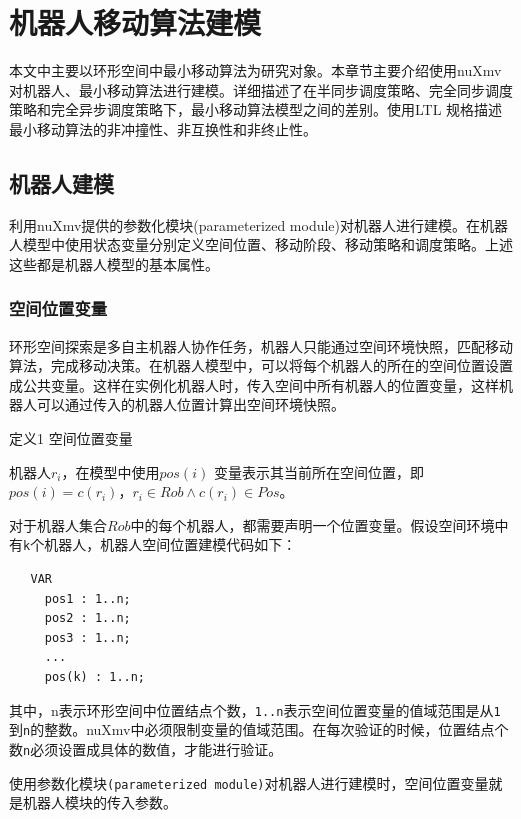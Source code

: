 ﻿\chapter{机器人移动算法建模}
本文中主要以环形空间中最小移动算法为研究对象。本章节主要介绍使用nuXmv对机器人、最小移动算法进行建模。详细描述了在半同步调度策略、完全同步调度策略和完全异步调度策略下，最小移动算法模型之间的差别。使用LTL 规格描述最小移动算法的非冲撞性、非互换性和非终止性。

\section{机器人建模}
利用nuXmv提供的参数化模块(parameterized module)对机器人进行建模。在机器人模型中使用状态变量分别定义空间位置、移动阶段、移动策略和调度策略。上述这些都是机器人模型的基本属性。

\subsection{空间位置变量}
环形空间探索是多自主机器人协作任务，机器人只能通过空间环境快照，匹配移动算法，完成移动决策。在机器人模型中，可以将每个机器人的所在的空间位置设置成公共变量。这样在实例化机器人时，传入空间中所有机器人的位置变量，这样机器人可以通过传入的机器人位置计算出空间环境快照。

\vspace{0.5cm}

\begin{bfseries} 定义1 \quad 空间位置变量 \quad \end{bfseries} 机器人$r_i$，在模型中使用$pos\left(i\right)$ 变量表示其当前所在空间位置，即$pos\left(i\right) = c\left(r_i\right)$，$r_i \in Rob \land c\left(r_i\right) \in Pos $。

\vspace{0.5cm}

对于机器人集合$Rob$中的每个机器人，都需要声明一个位置变量。假设空间环境中有\verb|k|个机器人，机器人空间位置建模代码如下：

\begin{lstlisting}
   VAR
     pos1 : 1..n;
     pos2 : 1..n;
     pos3 : 1..n;
     ...
     pos(k) : 1..n;
\end{lstlisting}

其中，n表示环形空间中位置结点个数，\verb|1..n|表示空间位置变量的值域范围是从\verb|1|到\verb|n|的整数。nuXmv中必须限制变量的值域范围。在每次验证的时候，位置结点个数\verb|n|必须设置成具体的数值，才能进行验证。

使用参数化模块\verb|(parameterized module)|对机器人进行建模时，空间位置变量就是机器人模块的传入参数。

